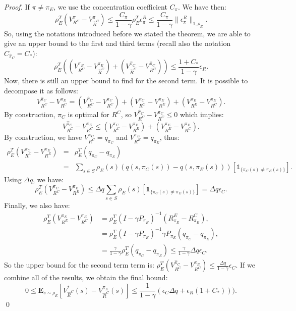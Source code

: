 \documentclass[smallextended]{svjour3}
\newcommand{\E}{\mathbf{E}}
\begin{document}
\begin{proof}
If $\pi\neq\pi_E$, we use the concentration coefficient $C_\pi$. We have then:
\begin{equation}
  \rho_E^T(V^{\pi}_{R^C}-V^{\pi}_{\hat{R}^C})\leq\frac{C_\pi}{1-\gamma}\rho_E^T\epsilon^R_{\pi}\leq\frac{C_\pi}{1-\gamma}\|\epsilon^R_{\pi}\|_{1,\rho_E}.
  \end{equation}
So, using the notations introduced before we stated the theorem, we are able to give an upper bound to the first and third terms (recall also the notation $C_{\hat \pi_C} = C_*$):
\begin{equation}
\rho_E^T((V^{\pi_E}_{R^C}-V^{\pi_E}_{\hat{R}^C})+(V^{\hat{\pi}_C}_{\hat{R}^C}-V^{\hat{\pi}_C}_{R^C}))\leq\frac{1+C_*}{1-\gamma}\epsilon_R.
\end{equation}
Now, there is still an upper bound to find for the second term. It is possible to decompose it as follows:
\begin{equation}
V^{\hat{\pi}_C}_{R^C}-V^{\pi_E}_{R^C}=(V^{\hat{\pi}_C}_{R^C}-V^{\pi_C}_{R^C})+(V^{\pi_C}_{R^C}-V^{\pi_E}_{R^E})+(V^{\pi_E}_{R^E}-V^{\pi_E}_{R^C}).
\end{equation}
By construction, $\pi_C$ is optimal for $R^C$, so $V^{\hat{\pi}_C}_{R^C}-V^{\pi_C}_{R^C}\leq0$ which implies:
\begin{equation}
V^{\hat{\pi}_C}_{R^C}-V^{\pi_E}_{R^C}\leq(V^{\pi_C}_{R^C}-V^{\pi_E}_{R^E})+(V^{\pi_E}_{R^E}-V^{\pi_E}_{R^C}).
\end{equation}
By construction, we have $V^{\pi_C}_{R^C}=q_{\pi_C}$ and $V^{\pi_E}_{R^E}=q_{\pi_E}$, thus:
\begin{eqnarray}
\rho_E^T(V^{\pi_C}_{R^C}-V^{\pi_E}_{R^E})&=&\rho_E^T(q_{\pi_C}-q_{\pi_E})\\
&=&\sum_{s\in S}\rho_E(s)(q(s,\pi_C(s))-q(s,\pi_E(s)))[\mathds{1}_{\{\pi_C(s)\neq\pi_E(s)\}}].
\end{eqnarray}
Using $\Delta q$, we have:
\begin{equation}
\rho_E^T(V^{\pi_C}_{R^C}-V^{\pi_E}_{R^E})\leq\Delta q\sum_{s\in S}\rho_E(s)[\mathds{1}_{\{\pi_C(s)\neq\pi_E(s)\}}]= \Delta q \epsilon_C.
\end{equation}
Finally, we also have:
\begin{align}
\rho_E^T(V^{\pi_E}_{R^E}-V^{\pi_E}_{R^C})&=\rho_E^T(I-\gamma P_{\pi_E})^{-1}(R^E_{\pi_E}-R^C_{\pi_E}),
\\
&=\rho_E^T(I-\gamma P_{\pi_E})^{-1}\gamma P_{\pi_E}(q_{\pi_C}-q_{\pi_E}),
\\
&=\frac{\gamma}{1-\gamma}\rho_E^T(q_{\pi_C}-q_{\pi_E})\leq \frac{\gamma}{1-\gamma}\Delta q \epsilon_C.
\end{align}
So the upper bound for the second term term is: $\rho_E^T(V^{\hat{\pi}_C}_{R^C}-V^{\pi_E}_{R^C})\leq \frac{\Delta q}{1-\gamma}\epsilon_C$.
If we combine all of the results, we obtain the final bound:
\begin{equation}
0\leq\E_{s\sim\rho_E}[V^*_{\hat{R}^C}(s)-V^{\pi_E}_{\hat{R}^C}(s)]\leq \frac{1}{1-\gamma}(\epsilon_C\Delta q +\epsilon_R(1+C_*))).
\end{equation}
\qed
\end{proof}
\end{document}
